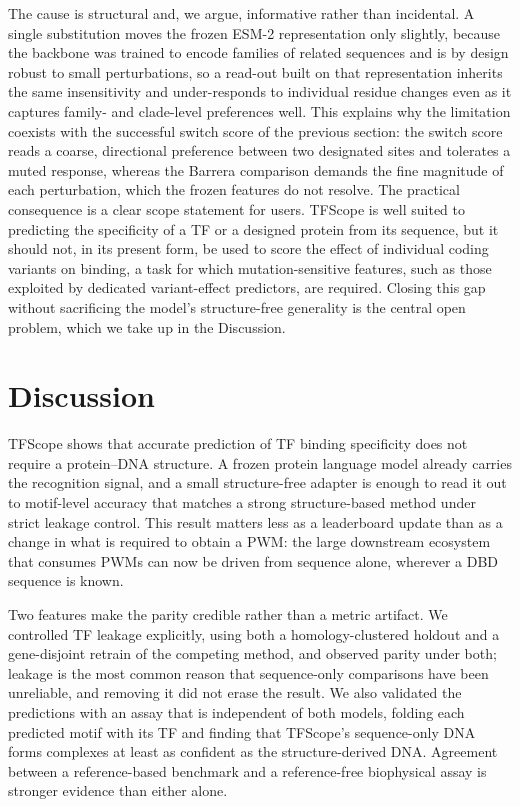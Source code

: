 \documentclass[11pt]{article}
\begin{document}
The cause is structural and, we argue, informative rather than incidental. A single
substitution moves the frozen ESM-2 representation only slightly, because the backbone
was trained to encode families of related sequences and is by design robust to small
perturbations, so a read-out built on that representation inherits the same insensitivity
and under-responds to individual residue changes even as it captures family- and
clade-level preferences well. This explains why the limitation coexists with the
successful switch score of the previous section: the switch score reads a coarse,
directional preference between two designated sites and tolerates a muted response,
whereas the Barrera comparison demands the fine magnitude of each perturbation, which
the frozen features do not resolve. The practical consequence is a clear scope
statement for users. TFScope is well suited to predicting the specificity of a TF or a
designed protein from its sequence, but it should not, in its present form, be used to
score the effect of individual coding variants on binding, a task for which
mutation-sensitive features, such as those exploited by dedicated variant-effect
predictors\cite{meier2021language,brandes2023genome}, are required. Closing this gap without sacrificing the
model's structure-free generality is the central open problem, which we take up in the
Discussion.

\section*{Discussion}

TFScope shows that accurate prediction of TF binding specificity does not require a
protein--DNA structure. A frozen protein language model already carries the
recognition signal, and a small structure-free adapter is enough to read it out to
motif-level accuracy that matches a strong structure-based method under strict
leakage control. This result matters less as a leaderboard update than as a change in
what is required to obtain a PWM: the large downstream ecosystem that consumes PWMs
can now be driven from sequence alone, wherever a DBD sequence is known.

Two features make the parity credible rather than a metric artifact. We controlled TF
leakage explicitly, using both a homology-clustered holdout and a gene-disjoint
retrain of the competing method, and observed parity under both; leakage is the most
common reason that sequence-only comparisons have been unreliable, and removing it did
not erase the result. We also validated the predictions with an assay that is
independent of both models, folding each predicted motif with its TF and finding that
TFScope's sequence-only DNA forms complexes at least as confident as the
structure-derived DNA. Agreement between a reference-based benchmark and a
reference-free biophysical assay is stronger evidence than either alone.
\end{document}
